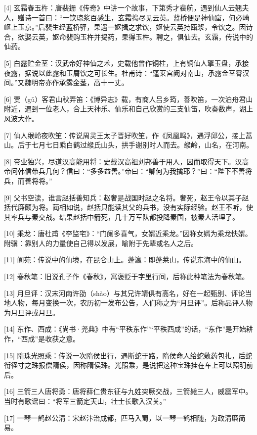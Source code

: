 \documentclass[12pt,UTF8]{ctexbook}
\begin{document}
[4] 玄霜舂玉杵：唐裴銏《传奇》中讲一个故事，下第秀才裴航，遇到仙人云翘夫人，赠诗一首曰：“一饮琼浆百感生，玄霜捣尽见云英。蓝桥便是神仙窟，何必崎岖上玉京。”后裴生经蓝桥驿，果遇一妪揖之求饮，妪使云英持瓯浆，令饮之。因诗合，欲娶云英，妪命裴购玉杵并捣药，果得玉杵。聘之，俱仙去。玄霜，传说中的仙药。

[5] 白露贮金茎：汉武帝好神仙之术，史载他曾作铜柱，上有铜仙人擎玉盘，承接夜露，据说以此露和玉屑饮之可长生。杜甫诗：“蓬莱宫阙对南山，承露金茎霄汉间。”又魏明帝亦作承露金茎，高十一丈。

[6] 贾（gǔ）客君山秋弄笛：《博异志》载，有商人吕乡筠，善吹笛，一次泊舟君山附近，遇到一位老人，合上天神乐、仙乐和自己欣赏的三支仙笛，吹奏数声，湖上风波大作。

[7] 仙人缑岭夜吹笙：传说周灵王太子晋好吹笙，作《凤凰鸣》，遇浮邱公，接上蒿山。后于七月七日乘白鹤过缑氏山头，拱手谢别时人而去。缑岭，山名，在河南。

[8] 帝业独兴，尽道汉高能用将：史载汉高祖刘邦善于用人，因而取得天下。汉高帝问韩信带兵几何？信曰：“多多益善。”帝曰：“卿何为我擒耶？”曰：“陛下不善将兵，而善将将。”

[9] 父书空读，谁言赵括善知兵：赵奢是战国时赵之名将。奢死，赵王令以其子赵括代廉颇为将。蔺相如说，赵括只能读其父的兵书，没有实际经验。赵王不听，使其率兵与秦交战。结果赵括中箭死，几十万军队都投降秦国，被秦人活埋了。

[10] 乘龙：唐杜甫《李监宅》：“门阑多喜气，女婿近乘龙。”因称女婿为乘龙快婿。附骥：靠别人的力量使自己得以发展，喻附于先辈或名人之后。

[11] 阆苑：传说中的仙境，在昆仑山上。蓬瀛：即蓬莱山，传说东海中的仙山。

[12] 春秋笔：旧说孔子作《春秋》，寓褒贬于字里行间，后称此种笔法为春秋笔。

[13] 月旦评：汉末河南许劭（shào）与其兄许靖俱有高名，好在一起甄别、评论当地人物，每月变换一次，农历初一发布公告，人们称之为“月旦评”。后称品评人物为月旦评或月旦。

[14] 东作、西成：《尚书·尧典》中有“平秩东作”“平秩西成”的话，“东作”是开始耕作，“西成”是收获之意。

[15] 隋珠光照乘：传说一次隋侯出行，遇断蛇于路，隋侯命人给蛇敷药包扎，后蛇衔径寸之珠报偿隋侯，因称隋侯珠。光照乘，是说把这种宝珠挂在车上可以照明前后。

[16] 三箭三人唐将勇：唐将薛仁贵东征与九姓突厥交战，三箭毙三人，威震军中。当时有歌谣曰：“将军三箭定天山，壮士长歌入汉关。”

[17] 一琴一鹤赵公清：宋赵汴治成都，匹马入蜀，以一琴一鹤相随，为政清廉简易。
\end{document}
